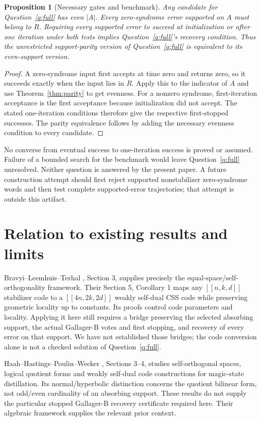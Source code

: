 \documentclass[11pt]{article}
\newtheorem{proposition}[theorem]{Proposition}
\begin{document}
\begin{proposition}[Necessary gates and benchmark]\label{prop:gates}
Any candidate for Question~\ref{q:full} has even $|A|$. Every zero-syndrome error supported on $A$ must belong to $R$. Requiring every supported error to succeed at initialization or after one iteration under both tests implies Question~\ref{q:full}'s recovery condition. Thus the unrestricted support-parity version of Question~\ref{q:full} is equivalent to its even-support version.
\end{proposition}
\begin{proof}
A zero-syndrome input first accepts at time zero and returns zero, so it succeeds exactly when the input lies in $R$. Apply this to the indicator of $A$ and use Theorem~\ref{thm:parity} to get evenness. For a nonzero syndrome, first-iteration acceptance is the first acceptance because initialization did not accept. The stated one-iteration conditions therefore give the respective first-stopped successes. The parity equivalence follows by adding the necessary evenness condition to every candidate.
\end{proof}
No converse from eventual success to one-iteration success is proved or assumed. Failure of a bounded search for the benchmark would leave Question~\ref{q:full} unresolved. Neither question is answered by the present paper. A future construction attempt should first reject supported nonstabilizer zero-syndrome words and then test complete supported-error trajectories; that attempt is outside this artifact.

\section{Relation to existing results and limits}
Bravyi--Leemhuis--Terhal \cite{blt}, Section 3, supplies precisely the equal-space/self-orthogonality framework. Their Section 5, Corollary 1 maps any $[[n,k,d]]$ stabilizer code to a $[[4n,2k,2d]]$ weakly self-dual CSS code while preserving geometric locality up to constants. Its proofs control code parameters and locality. Applying it here still requires a bridge preserving the selected absorbing support, the actual Gallager-B votes and first stopping, and recovery of every error on that support. We have not established those bridges; the code conversion alone is not a checked solution of Question~\ref{q:full}.

Haah--Hastings--Poulin--Wecker \cite{hhpw}, Sections 3--4, studies self-orthogonal spaces, logical quotient forms and weakly self-dual code constructions for magic-state distillation. Its normal/hyperbolic distinction concerns the quotient bilinear form, not odd/even cardinality of an absorbing support. These results do not supply the particular stopped Gallager-B recovery certificate required here. Their algebraic framework supplies the relevant prior context.
\end{document}
